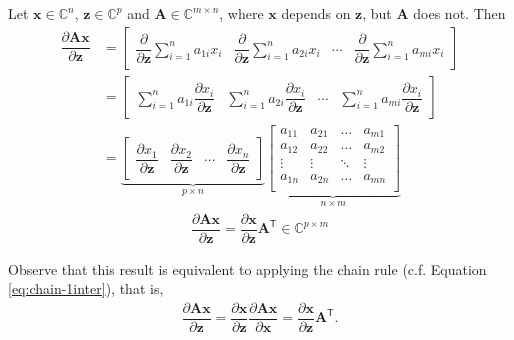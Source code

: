 \documentclass{article}
\newcommand{\trans}{\mathsf{T}}
\begin{document}
Let \(\mathbf{x} \in \mathbb{C}^{n}\), \(\mathbf{z} \in \mathbb{C}^{p}\) and \(\mathbf{A} \in \mathbb{C}^{m\times n}\), where \(\mathbf{x}\) depends on \(\mathbf{z}\), but \(\mathbf{A}\) does not. Then
\begin{align}
    \dfrac{\partial \mathbf{A}  \mathbf{x}}{\partial \mathbf{z}} & =
    \begin{bmatrix}
        \dfrac{\partial}{\partial \mathbf{z}}\sum_{i=1}^{n} a_{1i}x_i & \dfrac{\partial}{\partial \mathbf{z}}\sum_{i=1}^{n} a_{2i}x_i & \cdots & \dfrac{\partial}{\partial \mathbf{z}}\sum_{i=1}^{n} a_{mi}x_i
    \end{bmatrix} \\
    & = \begin{bmatrix}
        \sum_{i=1}^{n} a_{1i}\dfrac{\partial x_i}{\partial \mathbf{z}} & \sum_{i=1}^{n} a_{2i}\dfrac{\partial x_i}{\partial \mathbf{z}} & \cdots & \sum_{i=1}^{n} a_{mi}\dfrac{\partial x_i}{\partial \mathbf{z}}
    \end{bmatrix} \\
    & = \underbrace{\begin{bmatrix}
        \dfrac{\partial x_1}{\partial \mathbf{z}} & \dfrac{\partial x_2}{\partial \mathbf{z}} & \cdots & \dfrac{\partial x_n}{\partial \mathbf{z}}
    \end{bmatrix}}_{p \times n}
    \underbrace{\begin{bmatrix}
        a_{11} & a_{21} & \dots & a_{m1} \\
        a_{12} & a_{22} & \dots & a_{m2} \\
        \vdots & \vdots & \ddots & \vdots \\
        a_{1n} & a_{2n} & \dots & a_{mn} \\
    \end{bmatrix}}_{n \times m}
\end{align}
\begin{align}
    \boxed{\dfrac{\partial \mathbf{A}  \mathbf{x}}{\partial \mathbf{z}} = \dfrac{\partial \mathbf{x}}{\partial \mathbf{z}} \mathbf{A}^\trans \in \mathbb{C}^{p \times m}}
\end{align}

Observe that this result is equivalent to applying the chain rule (c.f. Equation \eqref{eq:chain-1inter}), that is,
\begin{align}
    \dfrac{\partial \mathbf{A}  \mathbf{x}}{\partial \mathbf{z}} = \dfrac{\partial \mathbf{x}}{\partial \mathbf{z}} \dfrac{\partial \mathbf{A}  \mathbf{x}}{\partial \mathbf{x}} = \dfrac{\partial \mathbf{x}}{\partial \mathbf{z}} \mathbf{A}^\trans.
\end{align}
\end{document}
